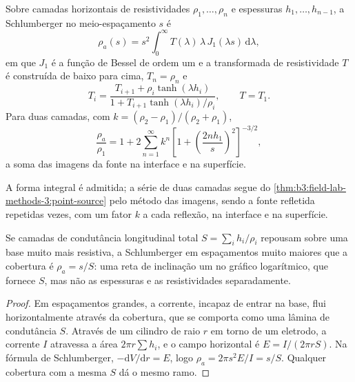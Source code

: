 \begin{proposition}\label{prop:b3:field-lab-methods-3:layers}
Sobre camadas horizontais de resistividades $\rho_1, \dots, \rho_n$ e
espessuras $h_1, \dots, h_{n-1}$, a  Schlumberger
no meio-espaçamento $s$ é
\[
\rho_a(s) = s^2\int_0^\infty T(\lambda)\,\lambda\,J_1(\lambda s)\,\mathrm{d}\lambda ,
\]
em que $J_1$ é a função de Bessel de ordem um e a transformada de resistividade
$T$ é construída de baixo para cima, $T_n = \rho_n$ e
\[
T_i = \frac{T_{i+1} + \rho_i\tanh(\lambda h_i)}{1 + T_{i+1}\tanh(\lambda h_i)/\rho_i} ,
\qquad T = T_1 .
\]
Para duas camadas, com $k = (\rho_2 - \rho_1)/(\rho_2 + \rho_1)$,
\[
\frac{\rho_a}{\rho_1} = 1 + 2\sum_{n=1}^{\infty} k^n
  \left[1 + \left(\frac{2nh_1}{s}\right)^2\right]^{-3/2} ,
\]
a soma das imagens da fonte na interface e na superfície.
\end{proposition}
A forma integral é admitida; a série de duas camadas segue do
\cref{thm:b3:field-lab-methods-3:point-source} pelo método das imagens,
sendo a fonte refletida repetidas vezes, com um fator $k$ a cada
reflexão, na interface e na superfície.

\begin{proposition}\label{prop:b3:field-lab-methods-3:conductance}
Se camadas de condutância longitudinal total $S = \sum_i h_i/\rho_i$ repousam
sobre uma base muito mais resistiva, a  Schlumberger em
espaçamentos muito maiores que a cobertura é $\rho_a = s/S$: uma reta de
inclinação um no gráfico logarítmico, que fornece $S$, mas não as
espessuras e as resistividades separadamente.
\end{proposition}

\begin{proof}
Em espaçamentos grandes, a corrente, incapaz de entrar na base, flui
horizontalmente através da cobertura, que se comporta como uma lâmina de
condutância $S$. Através de um cilindro de raio $r$ em torno de um eletrodo,
a corrente $I$ atravessa a área $2\pi r\sum h_i$, e o campo horizontal é
$E = I/(2\pi rS)$. Na fórmula de Schlumberger, $-\mathrm{d}V/
\mathrm{d}r = E$, logo $\rho_a = 2\pi s^2 E/I = s/S$. Qualquer cobertura com a
mesma $S$ dá o mesmo ramo.
\end{proof}

